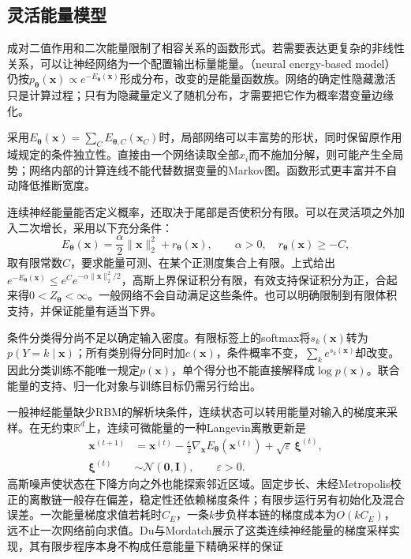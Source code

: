 \subsection{灵活能量模型}
\label{sec:pgm-energy-models-flexible}

成对二值作用和二次能量限制了相容关系的函数形式。若需要表达更复杂的非线性关系，可以让神经网络为一个配置输出标量能量。（neural energy-based model）仍按$p_{\bm{\theta}}(\bm{x})\propto e^{-E_{\bm{\theta}}(\bm{x})}$形成分布，改变的是能量函数族。网络的确定性隐藏激活只是计算过程；只有为隐藏量定义了随机分布，才需要把它作为概率潜变量边缘化。

采用$E_{\bm{\theta}}(\bm{x})=\sum_CE_{\bm{\theta},C}(\bm{x}_C)$时，局部网络可以丰富势的形状，同时保留原作用域规定的条件独立性。直接由一个网络读取全部$x_i$而不施加分解，则可能产生全局势；网络内部的计算连线不能代替数据变量的Markov图。函数形式更丰富并不自动降低推断宽度。

连续神经能量能否定义概率，还取决于尾部是否使积分有限。可以在灵活项之外加入二次增长，采用以下充分条件：
\[
  E_{\bm{\theta}}(\bm{x})
    =\frac{\alpha}{2}\lVert\bm{x}\rVert_2^2+r_{\bm{\theta}}(\bm{x}),
  \qquad \alpha>0,\quad r_{\bm{\theta}}(\bm{x})\geq-C,
\]
取有限常数$C$，要求能量可测、在某个正测度集合上有限。上式给出$e^{-E_{\bm{\theta}}(\bm{x})}\leq e^Ce^{-\alpha\lVert\bm{x}\rVert_2^2/2}$，高斯上界保证积分有限，有效支持保证积分为正，合起来得$0<Z_{\bm{\theta}}<\infty$。一般网络不会自动满足这些条件。也可以明确限制到有限体积支持，并保证能量有适当下界。

条件分类得分尚不足以确定输入密度。有限标签上的softmax将$s_k(\bm{x})$转为$p(Y=k\mid\bm{x})$；所有类别得分同时加$c(\bm{x})$，条件概率不变，$\sum_ke^{s_k(\bm{x})}$却改变。因此分类训练不能唯一规定$p(\bm{x})$，单个得分也不能直接解释成$\log p(\bm{x})$。联合能量的支持、归一化对象与训练目标仍需另行给出。

一般神经能量缺少RBM的解析块条件，连续状态可以转用能量对输入的梯度来采样。在无约束$\mathbb{R}^d$上，连续可微能量的一种Langevin离散更新是
\begin{equation}
  \begin{aligned}
    \bm{x}^{(t+1)}
      &=\bm{x}^{(t)}
        -\frac{\varepsilon}{2}
          \nabla_{\bm{x}}E_{\bm{\theta}}(\bm{x}^{(t)})
        +\sqrt{\varepsilon}\,\bm{\xi}^{(t)},\\
    \bm{\xi}^{(t)}&\sim\mathcal{N}(\bm{0},\bm{I}),
       \qquad \varepsilon>0.
  \end{aligned}
  \label{eq:pgm-energy-models-langevin}
\end{equation}
高斯噪声使状态在下降方向之外也能探索邻近区域。固定步长、未经Metropolis校正的离散链一般存在偏差，稳定性还依赖梯度条件；有限步运行另有初始化及混合误差。一次能量梯度求值若耗时$C_E$，一条$k$步负样本链的梯度成本为$O(kC_E)$，远不止一次网络前向求值。Du与Mordatch展示了这类连续神经能量的梯度采样实现，其有限步程序本身不构成任意能量下精确采样的保证

